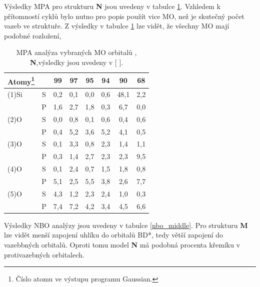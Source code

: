 \documentclass[
digital, %
table,   %
lof,     %
lot,     %
oneside,
]{fithesis3}
\begin{document}
Výsledky MPA pro strukturu \textbf{N} jsou uvedeny v tabulce \ref{si_model_orezany_MPA}. Vzhledem k přítomností cyklů bylo nutno pro popis použít vice MO, než je skutečný počet vazeb ve struktuře. Z výsledky v tabulce \ref{si_model_orezany_MPA} lze vidět, že všechny MO mají podobné rozložení,

\begin{table}[htbp]\begin{minipage}{\textwidth}
\caption{MPA analýza vybraných MO orbitalů , \textbf{N},výsledky jsou uvedeny v [ ].}
\begin{center}
\begin{tabular}{|l|c|c|c|c|c|c|c|}
\hline
Atomy\footnote{Číslo atomu ve výstupu programu Gaussian.}  \label{si_model_orezany_MPA} &  & 99 & 97 & 95 & 94 & 90 & 68 \\ \hline
(1)Si & S  & 0,2  & 0,1  & 0,0  & 0,6  & 48,1  & 2,2  \\ \hline
& P & 1,6  & 2,7  & 1,8  & 0,3  & 6,7  & 0,0  \\ \hline
(2)O & S  & 0,0  & 0,8  & 0,1  & 0,6  & 0,4  & 0,6  \\ \hline
& P & 0,4  & 5,2  & 3,6  & 5,2  & 4,1  & 0,5  \\ \hline
(3)O & S  & 0,1  & 3,3  & 0,8  & 2,3  & 1,4  & 1,1  \\ \hline
& P & 0,3  & 1,4  & 2,7  & 2,3  & 2,3  & 9,5  \\ \hline
(4)O & S  & 0,1  & 2,4  & 0,7  & 1,5  & 1,8  & 0,8  \\ \hline
& P & 5,1  & 2,5  & 5,5  & 3,8  & 2,6  & 7,7  \\ \hline
(5)O & S  & 4,3  & 1,2  & 2,3  & 2,4  & 1,0  & 0,3  \\ \hline
& P & 7,4  & 7,2  & 4,2  & 3,4  & 4,5  & 6,6 \\ \hline
\end{tabular}
\end{center}\end{minipage}\end{table}

Výsledky NBO analýzy jsou uvedeny v tabulce \ref{nbo_middle}. Pro strukturu \textbf{M} lze vidět menší zapojení uhlíku do orbitalů BD*, tedy větší zapojení do vazebbných orbitalů. Oproti tomu model \textbf{N} má podobná procenta křemíku v protivazebných orbitalech.
\end{document}
